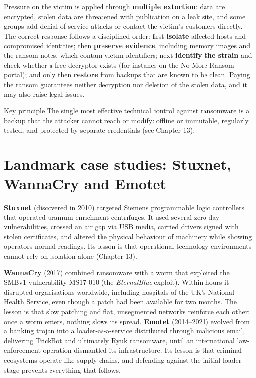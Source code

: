 Pressure on the victim is applied through \textbf{multiple extortion}: data are encrypted, stolen data are threatened with publication on a leak site, and some groups add denial-of-service attacks or contact the victim's customers directly. The correct response follows a disciplined order: first \textbf{isolate} affected hosts and compromised identities; then \textbf{preserve evidence}, including memory images and the ransom notes, which contain victim identifiers; next \textbf{identify the strain} and check whether a free decryptor exists (for instance on the No More Ransom portal); and only then \textbf{restore} from backups that are known to be clean. Paying the ransom guarantees neither decryption nor deletion of the stolen data, and it may also raise legal issues.

\begin{keybox}{Key principle}
The single most effective technical control against ransomware is a backup that the attacker cannot reach or modify: offline or immutable, regularly tested, and protected by separate credentials (see Chapter 13).
\end{keybox}

\section{Landmark case studies: Stuxnet, WannaCry and Emotet}\label{sec:4.6}
\textbf{Stuxnet} (discovered in 2010) targeted Siemens programmable logic controllers that operated uranium-enrichment centrifuges. It used several zero-day vulnerabilities, crossed an air gap via USB media, carried drivers signed with stolen certificates, and altered the physical behaviour of machinery while showing operators normal readings. Its lesson is that operational-technology environments cannot rely on isolation alone (Chapter 13).

\textbf{WannaCry} (2017) combined ransomware with a worm that exploited the SMBv1 vulnerability MS17-010 (the \emph{EternalBlue} exploit). Within hours it disrupted organisations worldwide, including hospitals of the UK's National Health Service, even though a patch had been available for two months. The lesson is that slow patching and flat, unsegmented networks reinforce each other: once a worm enters, nothing slows its spread. \textbf{Emotet} (2014–2021) evolved from a banking trojan into a loader-as-a-service distributed through malicious email, delivering TrickBot and ultimately Ryuk ransomware, until an international law-enforcement operation dismantled its infrastructure. Its lesson is that criminal ecosystems operate like supply chains, and defending against the initial loader stage prevents everything that follows.

